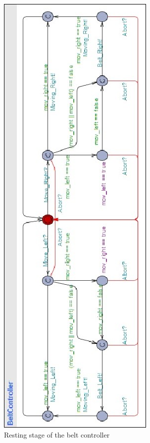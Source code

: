 \documentclass[a4paper,oneside,11pt]{report}
\begin{document}
\begin{figure}
\centering
\includegraphics[height=0.75\textheight]{images/BCT1.jpg}
\caption{Resting stage of the belt controller}
\label{fig:bct1}
\end{figure}
\end{document}
